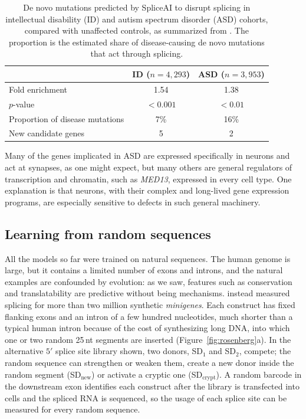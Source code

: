 \begin{table}[!htbp]
  \centering
  \caption{De novo mutations predicted by SpliceAI to disrupt splicing in intellectual disability (ID) and autism spectrum disorder (ASD) cohorts, compared with unaffected controls, as summarized from \citet{jaganathan2019}. The proportion is the estimated share of disease-causing de novo mutations that act through splicing.}
  \label{tab:denovo}
  \begin{tabular}{lcc}
    \toprule
    & ID ($n=4{,}293$) & ASD ($n=3{,}953$) \\
    \midrule
    Fold enrichment & 1.54 & 1.38 \\
    $p$-value & $<0.001$ & $<0.01$ \\
    Proportion of disease mutations & 7\% & 16\% \\
    New candidate genes & 5 & 2 \\
    \bottomrule
  \end{tabular}
\end{table}

Many of the genes implicated in ASD are expressed specifically in neurons and act at synapses, as one might expect, but many others are general regulators of transcription and chromatin, such as \textit{MED13}, expressed in every cell type. One explanation is that neurons, with their complex and long-lived gene expression programs, are especially sensitive to defects in such general machinery.

\subsection{Learning from random sequences}

All the models so far were trained on natural sequences. The human genome is large, but it contains a limited number of exons and introns, and the natural examples are confounded by evolution: as we saw, features such as conservation and translatability are predictive without being mechanisms. \citet{rosenberg2015} instead measured splicing for more than two million synthetic \emph{minigenes}. Each construct has fixed flanking exons and an intron of a few hundred nucleotides, much shorter than a typical human intron because of the cost of synthesizing long DNA, into which one or two random 25\,nt segments are inserted (Figure~\ref{fig:rosenberg}a). In the alternative $5'$ splice site library shown, two donors, SD$_1$ and SD$_2$, compete; the random sequence can strengthen or weaken them, create a new donor inside the random segment (SD$_\text{new}$) or activate a cryptic one (SD$_\text{crypt}$). A random barcode in the downstream exon identifies each construct after the library is transfected into cells and the spliced RNA is sequenced, so the usage of each splice site can be measured for every random sequence.

